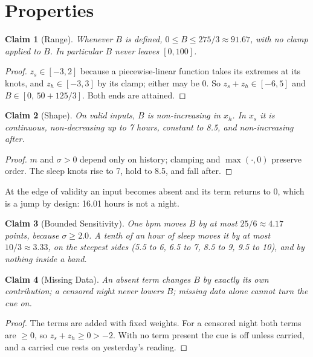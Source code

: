 \documentclass[11pt]{article}
\newtheorem{claim}{Claim}
\begin{document}
\section{Properties}
\begin{claim}[Range]
Whenever $B$ is defined, $0 \le B \le 275/3 \approx 91.67$, with no clamp applied
to $B$. In particular $B$ never leaves $[0, 100]$.
\end{claim}
\begin{proof}
$z_s \in [-3, 2]$ because a piecewise-linear function takes its extremes at its
knots, and $z_h \in [-3, 3]$ by its clamp; either may be 0. So
$z_s + z_h \in [-6, 5]$ and $B \in [0,\, 50 + 125/3]$. Both ends are attained.
\end{proof}
\begin{claim}[Shape]
On valid inputs, $B$ is non-increasing in $x_h$. In $x_s$ it is continuous,
non-decreasing up to 7 hours, constant to 8.5, and non-increasing after.
\end{claim}
\begin{proof}
$m$ and $\sigma > 0$ depend only on history; clamping and $\max(\cdot, 0)$
preserve order. The sleep knots rise to 7, hold to 8.5, and fall after.
\end{proof}
At the edge of validity an input becomes absent and its term returns to 0, which
is a jump by design: 16.01 hours is not a night.
\begin{claim}[Bounded Sensitivity]
One bpm moves $B$ by at most $25/6 \approx 4.17$ points, because
$\sigma \ge 2.0$. A tenth of an hour of sleep moves it by at most
$10/3 \approx 3.33$, on the steepest sides (5.5 to 6, 6.5 to 7, 8.5 to 9, 9.5 to
10), and by nothing inside a band.
\end{claim}
\begin{claim}[Missing Data]
An absent term changes $B$ by exactly its own contribution; a censored night
never lowers $B$; missing data alone cannot turn the cue on.
\end{claim}
\begin{proof}
The terms are added with fixed weights. For a censored night both terms are
$\ge 0$, so $z_s + z_h \ge 0 > -2$. With no term present the cue is off unless
carried, and a carried cue rests on yesterday's reading.
\end{proof}
\end{document}
